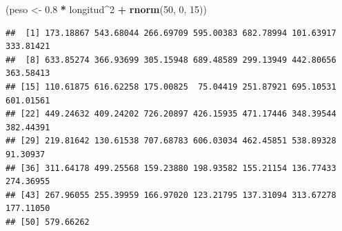 \documentclass[
]{article}
\newenvironment{Shaded}{\begin{snugshade}}{\end{snugshade}}
\newcommand{\DecValTok}[1]{\textcolor[rgb]{0.00,0.00,0.81}{#1}}
\newcommand{\FloatTok}[1]{\textcolor[rgb]{0.00,0.00,0.81}{#1}}
\newcommand{\FunctionTok}[1]{\textcolor[rgb]{0.13,0.29,0.53}{\textbf{#1}}}
\newcommand{\NormalTok}[1]{#1}
\newcommand{\OtherTok}[1]{\textcolor[rgb]{0.56,0.35,0.01}{#1}}
\newcommand{\SpecialCharTok}[1]{\textcolor[rgb]{0.81,0.36,0.00}{\textbf{#1}}}
\begin{document}
\begin{Shaded}
\begin{Highlighting}[]
\NormalTok{(peso }\OtherTok{\textless{}{-}} \FloatTok{0.8} \SpecialCharTok{*}\NormalTok{ longitud}\SpecialCharTok{\^{}}\DecValTok{2} \SpecialCharTok{+} \FunctionTok{rnorm}\NormalTok{(}\DecValTok{50}\NormalTok{, }\DecValTok{0}\NormalTok{, }\DecValTok{15}\NormalTok{))}
\end{Highlighting}
\end{Shaded}

\begin{verbatim}
##  [1] 173.18867 543.68044 266.69709 595.00383 682.78994 101.63917 333.81421
##  [8] 633.85274 366.93699 305.15948 689.48589 299.13949 442.80656 363.58413
## [15] 110.61875 616.62258 175.00825  75.04419 251.87921 695.10531 601.01561
## [22] 449.24632 409.24202 726.20897 426.15935 471.17446 348.39544 382.44391
## [29] 219.81642 130.61538 707.68783 606.03034 462.45851 538.89328  91.30937
## [36] 311.64178 499.25568 159.23880 198.93582 155.21154 136.77433 274.36955
## [43] 267.96055 255.39959 166.97020 123.21795 137.31094 313.67278 177.11050
## [50] 579.66262
\end{verbatim}
\end{document}
